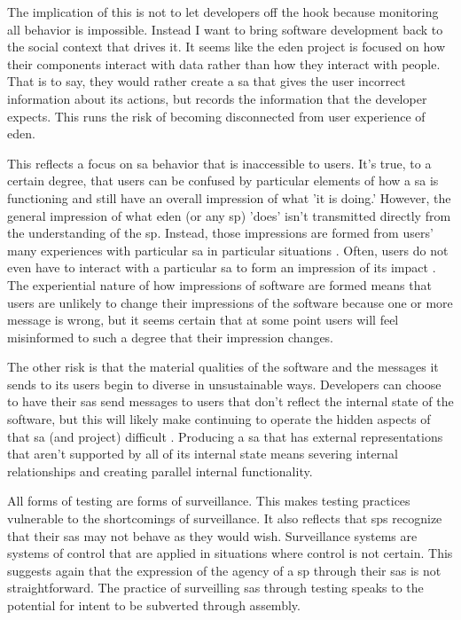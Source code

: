 \documentclass[a4paper,man,natbib,floatsintext]{apa6}
\begin{document}
   The implication of this is not to let developers off the hook because monitoring all behavior is impossible. Instead I want to bring software development back to the social context that drives it. It seems like the \acrshort{eden} project is focused on how their components interact with data rather than how they interact with people. That is to say, they would rather create a \gls{sa} that gives the user incorrect information about its actions, but records the information that the developer expects. This runs the risk of becoming disconnected from user experience of \acrshort{eden}\footnotemark.


   This reflects a focus on \gls{sa} behavior that is inaccessible to users. It's true, to a certain degree, that users can be confused by particular elements of how a \gls{sa} is functioning and still have an overall impression of what 'it is doing.' However, the general impression of what \acrshort{eden} (or any \gls{sp}) 'does' isn't transmitted directly from the understanding of the \gls{sp}. Instead, those impressions are formed from users' many experiences with particular \gls{sa} in particular situations \citep{Boellstorff2015-al,Eubanks2018-hc,Schull2012-nc}. Often, users do not even have to interact with a particular \gls{sa} to form an impression of its impact \citep{Kitchin2011-af}. The experiential nature of how impressions of software are formed means that users are unlikely to change their impressions of the software because one or more message is wrong, but it seems certain that at some point users will feel misinformed to such a degree that their impression changes.

   The other risk is that the material qualities of the software and the messages it sends to its users begin to diverse in unsustainable ways. Developers can choose to have their \glspl{sa} send messages to users that don't reflect the internal state of the software, but this will likely make continuing to operate the hidden aspects of that \gls{sa} (and project) difficult \citep{Bivens2017-tc}. Producing a \gls{sa} that has external representations that aren't supported by all of its internal state means severing internal relationships and creating parallel internal functionality. 

   All forms of testing are forms of surveillance. This makes testing practices vulnerable to the shortcomings of surveillance\footnotemark. It also reflects that \glspl{sp} recognize that their \glspl{sa} may not behave as they would wish. Surveillance systems are systems of control that are applied in situations where control is not certain. This suggests again that the expression of the agency of a \gls{sp} through their \glspl{sa} is not straightforward. The practice of surveilling \glspl{sa} through testing speaks to the potential for intent to be subverted through assembly. 
\end{document}
